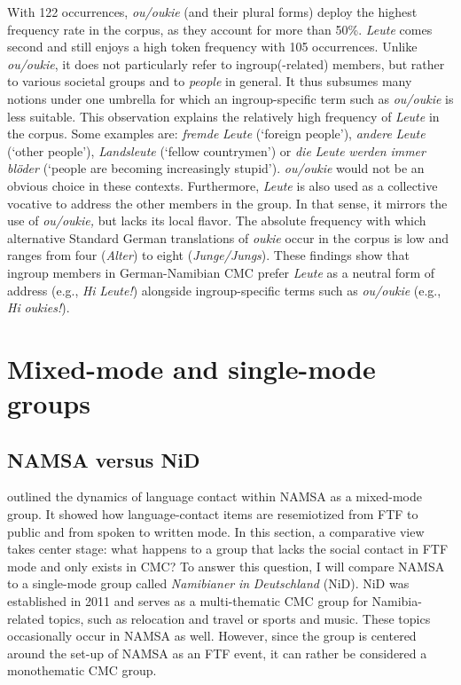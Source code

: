 \documentclass[output=paper]{langsci/langscibook}
\begin{document}
With 122 occurrences, \textit{ou/oukie} (and their plural forms) deploy the highest frequency rate in the corpus, as they account for more than 50\%. \textit{Leute} comes second and still enjoys a high token frequency with 105 occurrences. Unlike \textit{ou/oukie}, it does not particularly refer to ingroup(-related) members, but rather to various societal groups and to \textit{people} in general. It thus subsumes many notions under one umbrella for which an ingroup-specific term such as \textit{ou/oukie} is less suitable. This observation explains the relatively high frequency of \textit{Leute} in the corpus. Some examples are: \textit{fremde} \textit{Leute} (‘foreign people’), \textit{andere} \textit{Leute} (‘other people’), \textit{Landsleute} (‘fellow countrymen’) or \textit{die} \textit{Leute} \textit{werden} \textit{immer} \textit{blöder} (‘people are becoming increasingly stupid’). \textit{ou/oukie} would not be an obvious choice in these contexts. Furthermore, \textit{Leute} is also used as a collective vocative to address the other members in the group. In that sense, it mirrors the use of \textit{ou/oukie,} but lacks its local flavor. The absolute frequency with which alternative Standard German translations of \textit{oukie} occur in the corpus is low and ranges from four (\textit{Alter}) to eight (\textit{Junge/Jungs}). These findings show that ingroup members in German-Namibian CMC prefer \textit{Leute} as a neutral form of address (e.g., \textit{Hi} \textit{Leute!}) alongside ingroup-specific terms such as \textit{ou/oukie} (e.g., \textit{Hi} \textit{oukies!}).

 
 \section{Mixed-mode and single-mode groups}
\label{sec:radke:4}
 
  \subsection{NAMSA versus NiD}
  \label{sec:radke:4.1}
 

 outlined the dynamics of language contact within NAMSA as a mixed-mode group. It showed how language-contact items are resemiotized from FTF to public and from spoken to written mode. In this section, a comparative view takes center stage: what happens to a group that lacks the social contact in FTF mode and only exists in CMC? To answer this question, I will compare NAMSA to a single-mode group called \textit{Namibianer} \textit{in} \textit{Deutschland} (NiD). NiD was established in 2011 and serves as a multi-thematic CMC group for Namibia-related topics, such as relocation and travel or sports and music. These topics occasionally occur in NAMSA as well. However, since the group is centered around the set-up of NAMSA as an FTF event, it can rather be considered a monothematic CMC group. 
\end{document}
